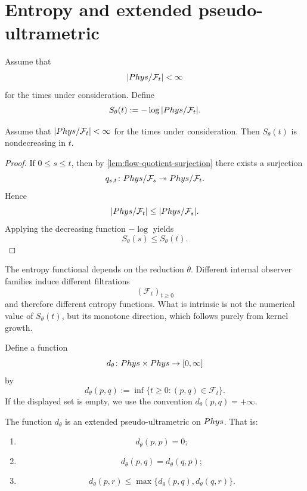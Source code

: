 \section{Entropy and extended pseudo-ultrametric}
\begin{definition}
	Assume that
	\[
		|Phys/\mathcal F_t|<\infty
	\]
	for the times under consideration. Define
	\[
		S_\theta(t):=-\log |Phys/\mathcal F_t|.
	\]
\end{definition}
\begin{proposition}
	Assume that \( |Phys/\mathcal F_t|<\infty \) for the times under
	consideration. Then \(S_\theta(t)\) is nondecreasing in \(t\).
\end{proposition}
\begin{proof}
	If \(0\le s\le t\), then by \cref{lem:flow-quotient-surjection} there
	exists a surjection
	\[
		q_{s,t}\colon Phys/\mathcal F_s\twoheadrightarrow Phys/\mathcal F_t.
	\]
	Hence
	\[
		|Phys/\mathcal F_t|
		\le
		|Phys/\mathcal F_s|.
	\]
	Applying the decreasing function \(-\log\) yields
	\[
		S_\theta(s)\le S_\theta(t).
	\]
\end{proof}
\begin{remark}
	The entropy functional depends on the reduction \(\theta\). Different
	internal observer families induce different filtrations
	\[
		(\mathcal F_t)_{t\ge0}
	\]
	and therefore different entropy functions. What is intrinsic is not the
	numerical value of \(S_\theta(t)\), but its monotone direction, which
	follows purely from kernel growth.
\end{remark}
\begin{definition}
	Define a function
	\[
		d_\theta\colon Phys\times Phys\to[0,\infty]
	\]
	by
	\[
		d_\theta(p,q)
		:=
		\inf\{t\ge0:(p,q)\in \mathcal F_t\}.
	\]
	If the displayed set is empty, we use the convention
	\(d_\theta(p,q)=+\infty\).
\end{definition}
\begin{proposition}
	The function \(d_\theta\) is an extended pseudo-ultrametric on
	\(Phys\). That is:
	\begin{enumerate}[label=\textup{(\roman*)}]
		\item
		      \[
			      d_\theta(p,p)=0;
		      \]
		\item
		      \[
			      d_\theta(p,q)=d_\theta(q,p);
		      \]
		\item
		      \[
			      d_\theta(p,r)\le \max\{d_\theta(p,q),d_\theta(q,r)\}.
		      \]
	\end{enumerate}
\end{proposition}
